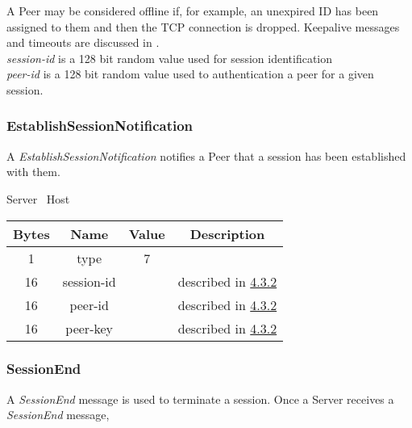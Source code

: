 \documentclass{article}
\begin{document}
    A Peer may be considered offline if, for example, an unexpired ID has been assigned to them and then the TCP
    connection is dropped. Keepalive messages and timeouts are discussed in %
    .\\

    \emph{session-id} is a 128 bit random value used for session identification\\

    \emph{peer-id} is a 128 bit random value used to authentication a peer for a given session.\\

    \subsubsection{EstablishSessionNotification}

    A \emph{EstablishSessionNotification} notifies a Peer that a session has been established with them.

    \begin{center}
        Server \textrightarrow\ Host\\
        \begin{tabular}{|c|c|c|c|}
            \hline
            \textbf{Bytes} & \textbf{Name} & \textbf{Value} & \textbf{Description}                                \\
            \hline
            1              & type          & 7              &                                                     \\
            \hline
            16             & session-id    &                & described in \hyperlink{subsubsection.4.3.2}{4.3.2} \\
            \hline
            16             & peer-id       &                & described in \hyperlink{subsubsection.4.3.2}{4.3.2} \\
            \hline
            16             & peer-key      &                & described in \hyperlink{subsubsection.4.3.2}{4.3.2} \\
            \hline
        \end{tabular}
    \end{center}

    \subsubsection{SessionEnd}

    A \emph{SessionEnd} message is used to terminate a session. Once a Server receives a \emph{SessionEnd} message,
\end{document}
